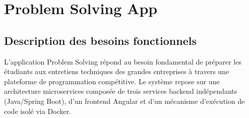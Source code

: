 \documentclass[12pt,a4paper]{report}
\begin{document}
	\section{Problem Solving App}
	
	\subsection{Description des besoins fonctionnels}
	L'application Problem Solving répond au besoin fondamental de préparer les étudiants aux entretiens techniques des grandes entreprises à travers une plateforme de programmation compétitive. Le système repose sur une architecture microservices composée de trois services backend indépendants (Java/Spring Boot), d'un frontend Angular et d'un mécanisme d'exécution de code isolé via Docker.
	
\end{document}
